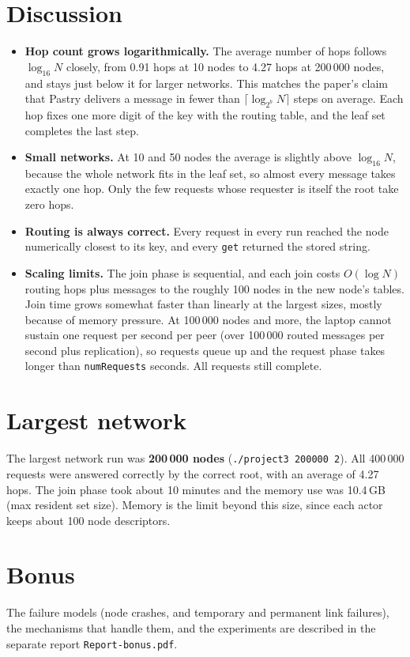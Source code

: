 \documentclass[10pt]{article}
\begin{document}
\section{Discussion}
\begin{itemize}
  \item \textbf{Hop count grows logarithmically.} The average number of hops follows $\log_{16} N$ closely, from 0.91 hops at 10 nodes to 4.27 hops at 200\,000 nodes, and stays just below it for larger networks.
  This matches the paper's claim that Pastry delivers a message in fewer than $\lceil \log_{2^b} N \rceil$ steps on average.
  Each hop fixes one more digit of the key with the routing table, and the leaf set completes the last step.
  \item \textbf{Small networks.} At 10 and 50 nodes the average is slightly above $\log_{16} N$, because the whole network fits in the leaf set, so almost every message takes exactly one hop.
  Only the few requests whose requester is itself the root take zero hops.
  \item \textbf{Routing is always correct.} Every request in every run reached the node numerically closest to its key, and every \texttt{get} returned the stored string.
  \item \textbf{Scaling limits.} The join phase is sequential, and each join costs $O(\log N)$ routing hops plus messages to the roughly 100 nodes in the new node's tables.
  Join time grows somewhat faster than linearly at the largest sizes, mostly because of memory pressure.
  At 100\,000 nodes and more, the laptop cannot sustain one request per second per peer (over 100\,000 routed messages per second plus replication), so requests queue up and the request phase takes longer than \texttt{numRequests} seconds. All requests still complete.
\end{itemize}

\section{Largest network}
The largest network run was \textbf{200\,000 nodes} (\texttt{./project3 200000 2}).
All 400\,000 requests were answered correctly by the correct root, with an average of 4.27 hops.
The join phase took about 10 minutes and the memory use was 10.4\,GB (max resident set size).
Memory is the limit beyond this size, since each actor keeps about 100 node descriptors.

\section{Bonus}
The failure models (node crashes, and temporary and permanent link failures), the mechanisms that handle them, and the experiments are described in the separate report \texttt{Report-bonus.pdf}.
\end{document}
